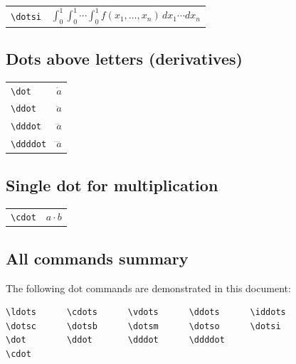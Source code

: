 \documentclass{article}
\begin{document}
\noindent
\begin{tabular}{ll}
\texttt{\textbackslash{}dotsi}   & $\int_{0}^{1} \int_{0}^{1} \dotsi \int_{0}^{1} f(x_1, \dots, x_n) \, dx_1 \dotsi dx_n$ \\
\end{tabular}

\subsection*{Dots above letters (derivatives)}

\noindent
\begin{tabular}{ll}
\texttt{\textbackslash{}dot}      & $\dot{a}$ \\
\texttt{\textbackslash{}ddot}     & $\ddot{a}$ \\
\texttt{\textbackslash{}dddot}    & $\dddot{a}$ \\
\texttt{\textbackslash{}ddddot}   & $\ddddot{a}$ \\
\end{tabular}

\subsection*{Single dot for multiplication}

\noindent
\begin{tabular}{ll}
\texttt{\textbackslash{}cdot}     & $a \cdot b$ \\
\end{tabular}

\subsection*{All commands summary}

The following dot commands are demonstrated in this document:

\begin{verbatim}
\ldots      \cdots      \vdots      \ddots      \iddots
\dotsc      \dotsb      \dotsm      \dotso      \dotsi
\dot        \ddot       \dddot      \ddddot
\cdot
\end{verbatim}
\end{document}
